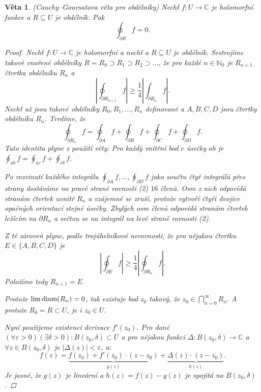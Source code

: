\documentclass[10pt,a4paper]{article}
\newcommand{\Cc}{{\mathbb{C}}}      %
\newcommand{\N}{{\mathbb{N}}}       %
\newcommand{\diam}{\normalfont{\text{diam}}}   	%
\newtheorem*{thm}{Věta}
\begin{document}
\begin{thm}(Cauchy–Goursatova věta pro obdélníky) Nechť $f: U \to \Cc$ je holomorfní funkce a $R \subseteq U$ je obdélník. Pak
	$$\oint_{\partial R} f = 0.$$
	\begin{proof}
		Nechť $f: U \to \Cc$ je holomorfní a nechť a $R \subseteq U$ je obdélník. 
		Sestrojíme takové vnořené obdélníky $R = R_0 \supset R_1 \supset R_2 \supset \ldots$, že pro každé $n \in \N_0$ je $R_{n+1}$ čtvrtka obdélníku $R_n$ a \begin{equation}
			\left| \oint_{\partial R_{n+1}}f\right| \geq \frac 14 \left|\int_{\partial R_n}f\right|.
		\end{equation}
		Nechť už jsou takové obdélníky $R_0 , R_1 , \ldots , R_n$ definované a $A, B,C, D$ jsou čtvrtky obdélníku $R_n$. 
		Tvrdíme, že \begin{equation}
			\oint_{\partial R_n}f = \oint_{\partial A}f + \oint_{\partial B}f + \oint_{\partial C}f + \oint_{\partial D}f.
		\end{equation}
		Tato identita plyne z použití věty: \textit{Pro každý vnitřní bod $c$ úsečky $ab$ je $ \oint_{ab}f = \oint_{ac}f + \oint_{cb}f $}. 
		
		Po rozvinutí každého integrálu $\oint_{\partial A}f,\ldots, \oint_{\partial D}f$ jako součtu čtyř integrálů přes strany dostáváme na pravé straně \textit{rovnosti (2)} $ 16 $ členů. 
		Osm z nich odpovídá stranám čtvrtek uvnitř $R_n$ a vzájemně se zruší, protože vytvoří čtyři dvojice opačných orientací stejné úsečky. 
		Zbylých osm členů odpovídá stranám čtvrtek ležícím na $\partial R_n$ a sečtou se na integrál na levé straně \textit{rovnosti (2)}.
		
		Z té zároveň plyne, podle trojúhelníkové nerovnosti, že pro nějakou čtvrtku $E \in \{A, B, C, D\}$ je \[
		\left| \oint_{\partial E}f\right| \geq \frac 14 \left| \oint_{\partial R_n}f\right|.
		\] Položíme tedy $R_{n+1} = E$.
		
		Protože $\lim \diam(R_n) = 0$, tak existuje bod $z_0$ takový, že $\displaystyle z_0\in \bigcap_{n=0}^{\infty}R_n.$
		A protože $R_0 = R \subset U$, je i $z_0 \in U$. 
		
		Nyní použijeme existenci derivace $f'(z_0)$. 
		Pro dané $(\forall \varepsilon > 0)(\exists \delta > 0): B(z_0, \delta) \subset U$ a pro nějakou funkci $\Delta: B(z_0 , \delta) \to \Cc$ a $\forall z \in B(z_0, \delta)$ je $|\Delta(z)| < \varepsilon$, a:\[
			f(z) = \underbrace{f(z_0) + f'(z_0) \cdot (z-z_0)}_{g(z)} + \underbrace{\Delta(z) \cdot (z-z_0)}_{h(z)}.
		\]		
		Je jasné, že $ g(z) $ je lineární a $h(z) = f (z) - g(z)$ je spojitá na $B(z_0 , \delta)$. 
		

\end{proof}
\end{thm}
\end{document}
